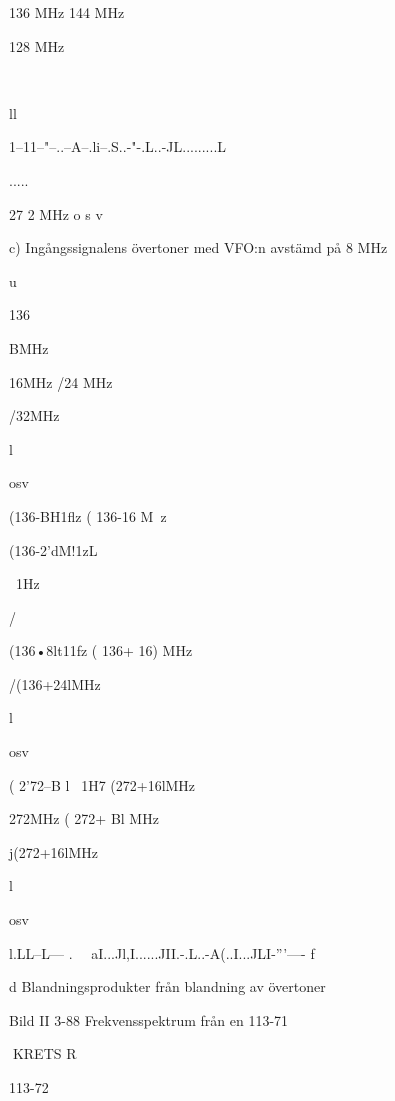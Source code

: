 136 MHz
144 MHz

128 MHz

\

ll

1--11--"--..--A--.li--.S..-"-.L..-JL.........L

.....

27 2 MHz o s v

c) Ingångssignalens övertoner med VFO:n avstämd på 8 MHz

u

136

BMHz

16MHz
/24 MHz

/32MHz

l

osv

(136-BH1flz
( 136-16 M~z\

(136-2'dM!1zL

~1Hz

/

(136•8lt11fz
( 136+ 16) MHz

/(136+24lMHz

l

osv

( 2'72--B l ~1H7
(272+16lMHz\
\

272MHz
( 272+ Bl MHz

j(272+16lMHz

l

osv

l.LL--L---   .~~ aI...Jl,I......JII.-.L..-A(..I...JLI-'''---- f

d Blandningsprodukter från blandning av övertoner

Bild II 3-88 Frekvensspektrum från en
113-71

KRETS R

113-72
